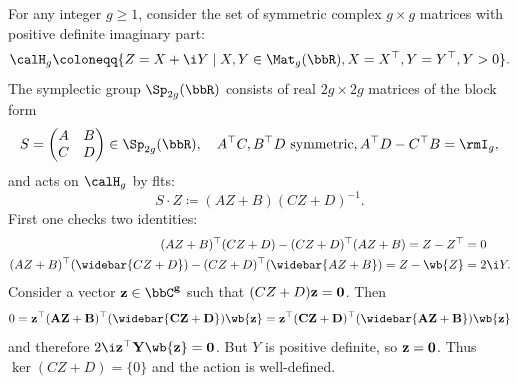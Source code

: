 \begin{example}\label{ex siegel upper half-space}
    For any integer $g\geq 1$, consider the set of symmetric complex $g\times g$ matrices with positive definite imaginary part:
    \[\calH_g \coloneqq \{Z=X+\i Y\mid X,Y\in \Mat_g(\bbR), X=X^\top, Y=Y^\top, Y>0\}.\]
    The symplectic group $\Sp_{2g}(\bbR)$ consists of real $2g\times 2g$ matrices of the block form 
    \[S=\begin{pmatrix}
        A & B\\
        C & D
    \end{pmatrix}\in\Sp_{2g}(\bbR),\quad A^\top C,B^\top D\text{ symmetric}, A^\top D-C^\top B=\rmI_g,\]
    and acts on $\calH_g$ by \glspl{flt}:
    \[S\cdot Z\coloneqq (AZ+B)(CZ+D)^{-1}.\]
    First one checks two identities:
    \begin{align}
        (AZ+B)^\top  (CZ+D)-(CZ+D)^\top (AZ+B)=Z-Z^\top &=0 \label{1y94}\\
        (AZ+B)^\top  (\widebar{CZ+D})-(CZ+D)^\top (\widebar{AZ+B})=Z-\wb{Z}&=2\i Y.\label{13702}
    \end{align}
    Consider a vector $\bf{z}\in\bbC^g$ such that $(CZ+D)\bf{z}=0$. Then 
    \[0=\bf{z}^\top  (AZ+B)^\top (\widebar{CZ+D})\wb{\bf{z}}=\bf{z}^\top  (CZ+D)^\top (\widebar{AZ+B})\wb{\bf{z}}\]
    and therefore $2\i \bf{z}^\top  Y \wb{\bf{z}}=0$. But $Y$ is positive definite, so $\bf{z}=0$. Thus $\ker(CZ+D)=\{0\}$ and the action is well-defined.


\end{example}
